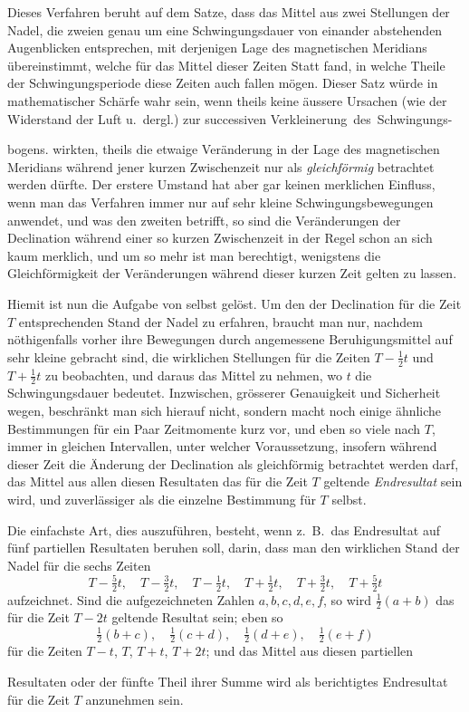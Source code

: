 Dieses Verfahren beruht auf dem Satze, dass das Mittel aus zwei Stellungen der Nadel, die zweien genau um eine Schwingungsdauer von einander abstehenden Augenblicken entsprechen, mit derjenigen Lage des magnetischen Meridians übereinstimmt, welche für das Mittel dieser Zeiten Statt fand, in welche Theile der Schwingungsperiode diese Zeiten auch fallen mögen. Dieser Satz würde in mathematischer Schärfe wahr sein, wenn theils keine äussere Ursachen (wie der Widerstand der Luft u.\ dergl.) zur successiven Verkleinerung~des~Schwingungs-
\par\clearpage
\begingroup
\renewcommand{\footnoterule}{\kern-4.35pt\hrule width .256\columnwidth height .35pt\kern4pt}
\noindent bogens. wirkten, theils die etwaige Veränderung in der Lage des magnetischen Meridians während jener kurzen Zwischenzeit nur als \textit{gleichförmig} betrachtet werden dürfte. Der erstere Umstand hat aber gar keinen merklichen Einfluss, wenn man das Verfahren immer nur auf sehr kleine Schwingungsbewegungen anwendet, und was den zweiten betrifft, so sind die Veränderungen der Declination während einer so kurzen Zwischenzeit in der Regel schon an sich kaum merklich, und um so mehr ist man berechtigt, wenigstens die Gleichförmigkeit der Veränderungen während dieser kurzen Zeit gelten zu lassen.

Hiemit ist nun die Aufgabe von selbst gelöst. Um den der Declination für die Zeit $T$ entsprechenden Stand der Nadel zu erfahren, braucht man nur, nachdem nöthigenfalls vorher ihre Bewegungen durch angemessene Beruhigungsmittel auf sehr kleine gebracht sind, die wirklichen Stellungen für die Zeiten $T-\tfrac12t$ und $T+\tfrac12t$ zu beobachten, und daraus das Mittel zu nehmen, wo $t$ die Schwingungsdauer bedeutet. Inzwischen, grösserer Genauigkeit und Sicherheit wegen, beschränkt man sich hierauf nicht, sondern macht noch einige ähnliche Bestimmungen für ein Paar Zeitmomente kurz vor, und eben so viele nach $T$, immer in gleichen Intervallen, unter welcher Voraussetzung, insofern während dieser Zeit die Änderung der Declination als gleichförmig betrachtet werden darf, das Mittel aus allen diesen Resultaten das für die Zeit $T$ geltende \textit{Endresultat} sein wird, und zuverlässiger als die einzelne Bestimmung für $T$ selbst.

Die einfachste Art, dies auszuführen, besteht, wenn z.\ B.\ das Endresultat auf fünf partiellen Resultaten beruhen soll, darin, dass man den wirklichen Stand der Nadel für die sechs Zeiten
\[
T-\tfrac52t,\quad T-\tfrac32t,\quad T-\tfrac12t,\quad T+\tfrac12t,\quad T+\tfrac32t,\quad T+\tfrac52t
\]
aufzeichnet. Sind die aufgezeichneten Zahlen $a,b,c,d,e,f$, so wird $\tfrac12(a+b)$ das für die Zeit $T-2t$ geltende Resultat sein; eben so
\[
\tfrac12(b+c),\quad\tfrac12(c+d),\quad\tfrac12(d+e),\quad\tfrac12(e+f)
\]
für die Zeiten $T-t$, $T$, $T+t$, $T+2t$; und das Mittel aus diesen partiellen
\par\clearpage
\endgroup
{}
\noindent Resultaten oder der fünfte Theil ihrer Summe wird als berichtigtes Endresultat für die Zeit $T$ anzunehmen sein.

